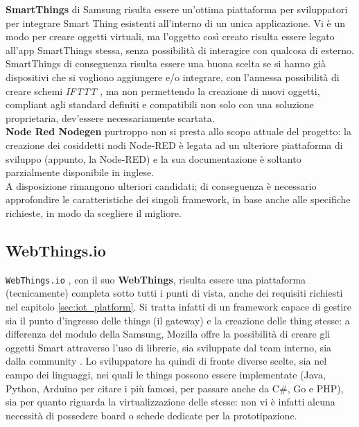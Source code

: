\documentclass[12pt,a4paper,openright,oneside]{report}
\begin{document}
\textbf{SmartThings} \cite{smartthings} di Samsung risulta essere un'ottima piattaforma per sviluppatori per integrare Smart Thing esistenti all'interno di un unica applicazione. Vi è un modo per creare oggetti virtuali, ma l'oggetto così creato risulta essere legato all'app SmartThings stessa, senza possibilità di interagire con qualcosa di esterno. SmartThings di conseguenza risulta essere una buona scelta se si hanno già dispositivi che si vogliono aggiungere e/o integrare, con l'annessa possibilità di creare schemi \textit{IFTTT} \cite{ifttt}, ma non permettendo la creazione di nuovi oggetti, compliant agli standard definiti e compatibili non solo con una soluzione proprietaria, dev'essere necessariamente scartata.\\

\textbf{Node Red Nodegen} \cite{nodered} purtroppo non si presta allo scopo attuale del progetto: la creazione dei cosiddetti nodi Node-RED è legata ad un ulteriore piattaforma di sviluppo (appunto, la Node-RED) e la sua documentazione è soltanto parzialmente disponibile in inglese.\\

A disposizione rimangono ulteriori candidati; di conseguenza è necessario approfondire le caratteristiche dei singoli framework, in base anche alle specifiche richieste, in modo da scegliere il migliore.\\


\subsection{WebThings.io}
\label{sec:webthingsio}
\texttt{WebThings.io} \cite{webthings}, con il suo \textbf{WebThings}, risulta essere una piattaforma (tecnicamente) completa sotto tutti i punti di vista, anche dei requisiti richiesti nel capitolo \ref{sec:iot_platform}. Si tratta infatti di un framework capace di gestire sia il punto d'ingresso delle things (il gateway) e la creazione delle thing stesse: a differenza del modulo della Samsung, Mozilla offre la possibilità di creare gli oggetti Smart attraverso l'uso di librerie, sia sviluppate dal team interno, sia dalla community \cite{webthings}. Lo sviluppatore ha quindi di fronte diverse scelte, sia nel campo dei linguaggi, nei quali le things possono essere implementate (Java, Python, Arduino per citare i più famosi, per passare anche da C\#, Go e PHP), sia per quanto riguarda la virtualizzazione delle stesse: non vi è infatti alcuna necessità di possedere board o schede dedicate per la prototipazione.\\
\end{document}

